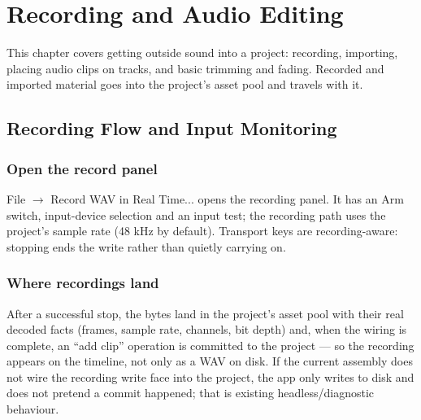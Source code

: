 
\chapter{Recording and Audio Editing}
\label{ch:recording-audio}






This chapter covers getting outside sound into a project: recording, importing,
placing audio clips on tracks, and basic trimming and fading. Recorded and imported
material goes into the project's asset pool and travels with it.

\section{Recording Flow and Input Monitoring}

\subsection{Open the record panel}

File $\to$ Record WAV in Real Time... opens the recording panel. It has an Arm switch,
input-device selection and an input test; the recording path uses the project's sample
rate (48 kHz by default). Transport keys are recording-aware: stopping ends the write
rather than quietly carrying on.


\subsection{Where recordings land}

After a successful stop, the bytes land in the project's asset pool with their real
decoded facts (frames, sample rate, channels, bit depth) and, when the wiring is
complete, an ``add clip'' operation is committed to the project — so the recording
appears on the timeline, not only as a WAV on disk. If the current assembly does not
wire the recording write face into the project, the app only writes to disk and does
not pretend a commit happened; that is existing headless/diagnostic behaviour.


